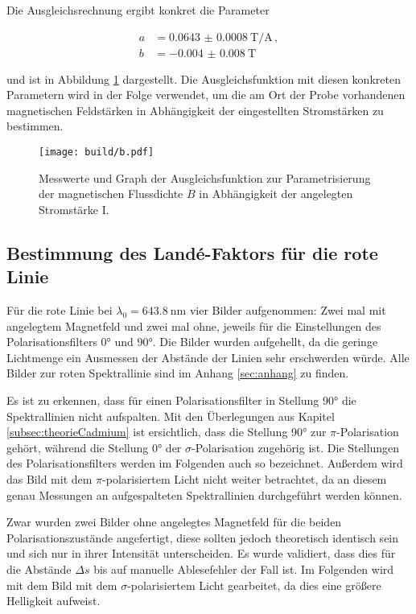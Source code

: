 Die Ausgleichsrechnung ergibt konkret die Parameter

\begin{align*}
  a &= \SI{0.0643(8)}{\tesla\per\ampere}\,,\\
  b &= \SI{-0.004(8)}{\tesla}\,
\end{align*}

und ist in Abbildung \ref{fig:bAusgleich} dargestellt.
Die Ausgleichsfunktion mit diesen konkreten Parametern wird in der Folge verwendet, um
die am Ort der Probe vorhandenen magnetischen Feldstärken in Abhängigkeit der eingestellten Stromstärken zu bestimmen.

\begin{figure}
  \centering
  \texttt{[image: build/b.pdf]}
  \caption{Messwerte und Graph der Ausgleichsfunktion zur Parametrisierung der magnetischen Flussdichte $B$ in Abhängigkeit der angelegten Stromstärke I.}
  \label{fig:bAusgleich}
\end{figure}

\subsection{Bestimmung des Landé-Faktors für die rote Linie}

Für die rote Linie bei $\lambda_0=\SI{643.8}{\nano\meter}$ vier Bilder aufgenommen: Zwei mal mit angelegtem Magnetfeld und zwei mal ohne, jeweils für die Einstellungen des Polarisationsfilters \ang{0} und \ang{90}.
Die Bilder wurden aufgehellt, da die geringe Lichtmenge ein Ausmessen der Abstände der Linien sehr erschwerden würde. Alle Bilder zur roten Spektrallinie sind im Anhang \ref{sec:anhang} zu finden.

Es ist zu erkennen, dass für einen Polarisationsfilter in Stellung \ang{90} die Spektrallinien nicht aufspalten. Mit den Überlegungen aus Kapitel \ref{subsec:theorieCadmium} ist ersichtlich, dass die Stellung \ang{90} zur $\pi$-Polarisation gehört, während die Stellung \ang{0} der $\sigma$-Polarisation zugehörig ist. Die Stellungen des Polarisationsfilters werden im Folgenden auch so bezeichnet. Außerdem wird das Bild mit dem $\pi$-polarisiertem Licht nicht weiter betrachtet, da an diesem genau Messungen an aufgespalteten Spektrallinien durchgeführt werden können.

Zwar wurden zwei Bilder ohne angelegtes Magnetfeld für die beiden Polarisationszustände angefertigt, diese sollten jedoch theoretisch identisch sein und sich nur in ihrer Intensität unterscheiden. Es wurde validiert, dass dies für die Abstände $\Delta s$ bis auf manuelle Ablesefehler der Fall ist.
Im Folgenden wird mit dem Bild mit dem $\sigma$-polarisiertem Licht gearbeitet, da dies eine größere Helligkeit aufweist.

